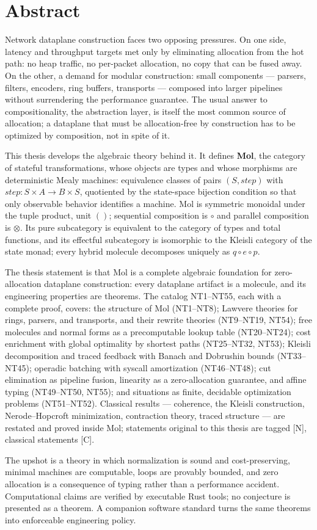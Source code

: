 \chapter*{Abstract}

Network dataplane construction faces two opposing pressures. On one side, latency and throughput targets met only by eliminating allocation from the hot path: no heap traffic, no per-packet allocation, no copy that can be fused away. On the other, a demand for modular construction: small components --- parsers, filters, encoders, ring buffers, transports --- composed into larger pipelines without surrendering the performance guarantee. The usual answer to compositionality, the abstraction layer, is itself the most common source of allocation; a dataplane that must be allocation-free by construction has to be optimized by composition, not in spite of it.

This thesis develops the algebraic theory behind it. It defines \textbf{Mol}, the category of stateful transformations, whose objects are types and whose morphisms are deterministic Mealy machines: equivalence classes of pairs $(S, \mathit{step})$ with $\mathit{step} : S \times A \to B \times S$, quotiented by the state-space bijection condition so that only observable behavior identifies a machine. Mol is symmetric monoidal under the tuple product, unit $()$; sequential composition is $\circ$ and parallel composition is $\otimes$. Its pure subcategory is equivalent to the category of types and total functions, and its effectful subcategory is isomorphic to the Kleisli category of the state monad; every hybrid molecule decomposes uniquely as $q \circ e \circ p$.

The thesis statement is that Mol is a complete algebraic foundation for zero-allocation dataplane construction: every dataplane artifact is a molecule, and its engineering properties are theorems. The catalog NT1--NT55, each with a complete proof, covers: the structure of Mol (NT1--NT8); Lawvere theories for rings, parsers, and transports, and their rewrite theories (NT9--NT19, NT54); free molecules and normal forms as a precomputable lookup table (NT20--NT24); cost enrichment with global optimality by shortest paths (NT25--NT32, NT53); Kleisli decomposition and traced feedback with Banach and Dobrushin bounds (NT33--NT45); operadic batching with syscall amortization (NT46--NT48); cut elimination as pipeline fusion, linearity as a zero-allocation guarantee, and affine typing (NT49--NT50, NT55); and situations as finite, decidable optimization problems (NT51--NT52). Classical results --- coherence, the Kleisli construction, Nerode--Hopcroft minimization, contraction theory, traced structure --- are restated and proved inside Mol; statements original to this thesis are tagged [N], classical statements [C].

The upshot is a theory in which normalization is sound and cost-preserving, minimal machines are computable, loops are provably bounded, and zero allocation is a consequence of typing rather than a performance accident. Computational claims are verified by executable Rust tools; no conjecture is presented as a theorem. A companion software standard turns the same theorems into enforceable engineering policy.
